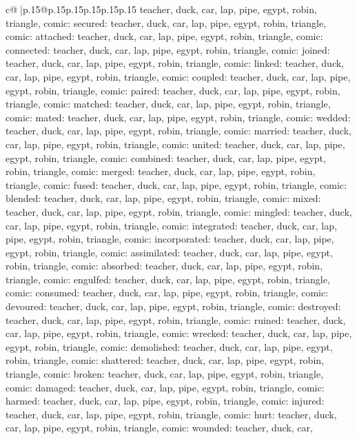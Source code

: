\documentclass{article}
\begin{document}
{\begin{supertabular}{c@{$\;$}|p{.15\linewidth}@{}p{.15\linewidth}p{.15\linewidth}p{.15\linewidth}p{.15\linewidth}p{.15\linewidth}}
{{{teacher, duck, car, lap, pipe, egypt, robin, triangle, comic\n\nCLUE: secured\nTARGETS: teacher, duck, car, lap, pipe, egypt, robin, triangle, comic\n\nCLUE: attached\nTARGETS: teacher, duck, car, lap, pipe, egypt, robin, triangle, comic\n\nCLUE: connected\nTARGETS: teacher, duck, car, lap, pipe, egypt, robin, triangle, comic\n\nCLUE: joined\nTARGETS: teacher, duck, car, lap, pipe, egypt, robin, triangle, comic\n\nCLUE: linked\nTARGETS: teacher, duck, car, lap, pipe, egypt, robin, triangle, comic\n\nCLUE: coupled\nTARGETS: teacher, duck, car, lap, pipe, egypt, robin, triangle, comic\n\nCLUE: paired\nTARGETS: teacher, duck, car, lap, pipe, egypt, robin, triangle, comic\n\nCLUE: matched\nTARGETS: teacher, duck, car, lap, pipe, egypt, robin, triangle, comic\n\nCLUE: mated\nTARGETS: teacher, duck, car, lap, pipe, egypt, robin, triangle, comic\n\nCLUE: wedded\nTARGETS: teacher, duck, car, lap, pipe, egypt, robin, triangle, comic\n\nCLUE: married\nTARGETS: teacher, duck, car, lap, pipe, egypt, robin, triangle, comic\n\nCLUE: united\nTARGETS: teacher, duck, car, lap, pipe, egypt, robin, triangle, comic\n\nCLUE: combined\nTARGETS: teacher, duck, car, lap, pipe, egypt, robin, triangle, comic\n\nCLUE: merged\nTARGETS: teacher, duck, car, lap, pipe, egypt, robin, triangle, comic\n\nCLUE: fused\nTARGETS: teacher, duck, car, lap, pipe, egypt, robin, triangle, comic\n\nCLUE: blended\nTARGETS: teacher, duck, car, lap, pipe, egypt, robin, triangle, comic\n\nCLUE: mixed\nTARGETS: teacher, duck, car, lap, pipe, egypt, robin, triangle, comic\n\nCLUE: mingled\nTARGETS: teacher, duck, car, lap, pipe, egypt, robin, triangle, comic\n\nCLUE: integrated\nTARGETS: teacher, duck, car, lap, pipe, egypt, robin, triangle, comic\n\nCLUE: incorporated\nTARGETS: teacher, duck, car, lap, pipe, egypt, robin, triangle, comic\n\nCLUE: assimilated\nTARGETS: teacher, duck, car, lap, pipe, egypt, robin, triangle, comic\n\nCLUE: absorbed\nTARGETS: teacher, duck, car, lap, pipe, egypt, robin, triangle, comic\n\nCLUE: engulfed\nTARGETS: teacher, duck, car, lap, pipe, egypt, robin, triangle, comic\n\nCLUE: consumed\nTARGETS: teacher, duck, car, lap, pipe, egypt, robin, triangle, comic\n\nCLUE: devoured\nTARGETS: teacher, duck, car, lap, pipe, egypt, robin, triangle, comic\n\nCLUE: destroyed\nTARGETS: teacher, duck, car, lap, pipe, egypt, robin, triangle, comic\n\nCLUE: ruined\nTARGETS: teacher, duck, car, lap, pipe, egypt, robin, triangle, comic\n\nCLUE: wrecked\nTARGETS: teacher, duck, car, lap, pipe, egypt, robin, triangle, comic\n\nCLUE: demolished\nTARGETS: teacher, duck, car, lap, pipe, egypt, robin, triangle, comic\n\nCLUE: shattered\nTARGETS: teacher, duck, car, lap, pipe, egypt, robin, triangle, comic\n\nCLUE: broken\nTARGETS: teacher, duck, car, lap, pipe, egypt, robin, triangle, comic\n\nCLUE: damaged\nTARGETS: teacher, duck, car, lap, pipe, egypt, robin, triangle, comic\n\nCLUE: harmed\nTARGETS: teacher, duck, car, lap, pipe, egypt, robin, triangle, comic\n\nCLUE: injured\nTARGETS: teacher, duck, car, lap, pipe, egypt, robin, triangle, comic\n\nCLUE: hurt\nTARGETS: teacher, duck, car, lap, pipe, egypt, robin, triangle, comic\n\nCLUE: wounded\nTARGETS: teacher, duck, car, }}}
\end{supertabular}}
\end{document}
